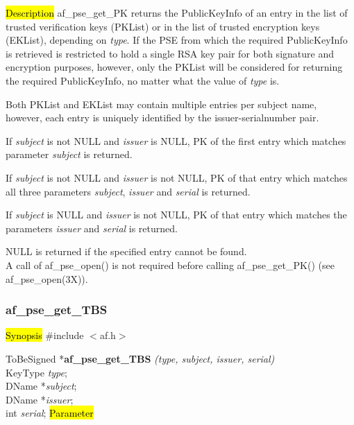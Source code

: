 


\hl{Description}
af\_pse\_get\_PK returns the PublicKeyInfo of an entry in the list of trusted 
verification keys (PKList) or in the list of trusted encryption keys (EKList), depending
on {\em type}.
If the PSE from which the required PublicKeyInfo is retrieved is restricted to hold a single RSA key pair
for both signature and encryption purposes, however, only the PKList will be considered for returning the required PublicKeyInfo,
no matter what the value of {\em type} is.

Both PKList and EKList may contain multiple entries per subject name, however,
each entry is uniquely identified by the issuer-serialnumber pair.

If {\em subject} is not NULL and {\em issuer} is NULL, PK of the first entry which
matches parameter {\em subject} is returned.

If {\em subject} is not NULL and {\em issuer} is not NULL, PK of that entry which 
matches all three parameters {\em subject}, {\em issuer} and {\em serial} is returned.
 
If {\em subject} is NULL and {\em issuer} is not NULL, PK of that entry which matches the
parameters {\em issuer} and {\em serial} is returned.

NULL is returned if the specified entry cannot be found.
\\ [1em]
A call of af\_pse\_open() is not required before calling af\_pse\_get\_PK()
(see af\_pse\_open(3X)).

\subsubsection{af\_pse\_get\_TBS}
\label{af_search_tbs_Name}
\hl{Synopsis}
\#include $<$af.h$>$

ToBeSigned *{\bf af\_pse\_get\_TBS} {\em (type, subject, issuer, serial)} \\
KeyType {\em type}; \\
DName *{\em subject}; \\
DName *{\em issuer}; \\
int {\em serial};
\hl{Parameter}

